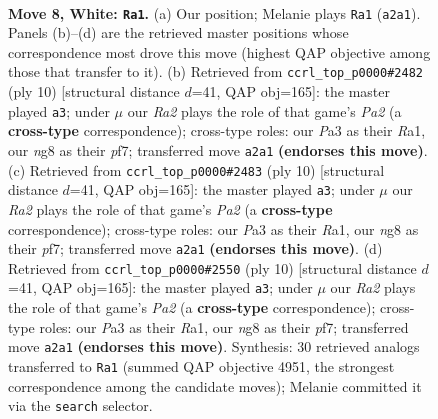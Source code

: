 \documentclass[11pt]{article}
\begin{document}
\begin{figure}[p]\centering
\begin{subfigure}{0.46\textwidth}\centering
\resizebox{\linewidth}{!}{%
\newchessgame
\chessboard[
  setfen={r3kbnr/pp1b1pp1/1qn1p3/2ppP2p/3P4/P1P2N2/RP3PPP/1NBQKB1R w Kkq - 0 8},
  showmover=false,
  pgfstyle=straightmove, color=movearrow, markmove={a2-a1}
]}
\caption{}
\end{subfigure}\hfill
\begin{subfigure}{0.46\textwidth}\centering
\resizebox{\linewidth}{!}{%
\newchessgame
\chessboard[
  setfen={r1b1kbnr/pp3ppp/1qn1p3/2ppP3/3P4/2P2N2/PP3PPP/RNBQKB1R w KQkq - 3 6},
  showmover=false,
  pgfstyle=straightmove, color=movearrow, markmove={a2-a3}
]}
\caption{}
\end{subfigure}
\\[4pt]
\begin{subfigure}{0.46\textwidth}\centering
\resizebox{\linewidth}{!}{%
\newchessgame
\chessboard[
  setfen={r1b1kbnr/pp3ppp/1qn1p3/2ppP3/3P4/2P2N2/PP3PPP/RNBQKB1R w KQkq - 3 6},
  showmover=false,
  pgfstyle=straightmove, color=movearrow, markmove={a2-a3}
]}
\caption{}
\end{subfigure}\hfill
\begin{subfigure}{0.46\textwidth}\centering
\resizebox{\linewidth}{!}{%
\newchessgame
\chessboard[
  setfen={r1b1kbnr/pp3ppp/1qn1p3/2ppP3/3P4/2P2N2/PP3PPP/RNBQKB1R w KQkq - 3 6},
  showmover=false,
  pgfstyle=straightmove, color=movearrow, markmove={a2-a3}
]}
\caption{}
\end{subfigure}
\caption{\textbf{Move 8, White: \texttt{Ra1}.} (a) Our position; Melanie plays \texttt{Ra1} (\texttt{a2a1}). Panels (b)--(d) are the retrieved master positions whose correspondence most drove this move (highest QAP objective among those that transfer to it). (b) Retrieved from \texttt{ccrl\_top\_p0000\#2482} (ply 10) [structural distance $d$=41, QAP obj=165]: the master played \texttt{a3}; under $\mu$ our \emph{Ra2} plays the role of that game's \emph{Pa2} (a \textbf{cross-type} correspondence); cross-type roles: our \emph{P}a3 as their \emph{R}a1, our \emph{n}g8 as their \emph{p}f7; transferred move \texttt{a2a1} \textbf{(endorses this move)}. (c) Retrieved from \texttt{ccrl\_top\_p0000\#2483} (ply 10) [structural distance $d$=41, QAP obj=165]: the master played \texttt{a3}; under $\mu$ our \emph{Ra2} plays the role of that game's \emph{Pa2} (a \textbf{cross-type} correspondence); cross-type roles: our \emph{P}a3 as their \emph{R}a1, our \emph{n}g8 as their \emph{p}f7; transferred move \texttt{a2a1} \textbf{(endorses this move)}. (d) Retrieved from \texttt{ccrl\_top\_p0000\#2550} (ply 10) [structural distance $d$=41, QAP obj=165]: the master played \texttt{a3}; under $\mu$ our \emph{Ra2} plays the role of that game's \emph{Pa2} (a \textbf{cross-type} correspondence); cross-type roles: our \emph{P}a3 as their \emph{R}a1, our \emph{n}g8 as their \emph{p}f7; transferred move \texttt{a2a1} \textbf{(endorses this move)}. Synthesis: 30 retrieved analogs transferred to \texttt{Ra1} (summed QAP objective 4951, the strongest correspondence among the candidate moves); Melanie committed it via the \texttt{search} selector.}
\label{fig:thought-m14}
\end{figure}
\end{document}
